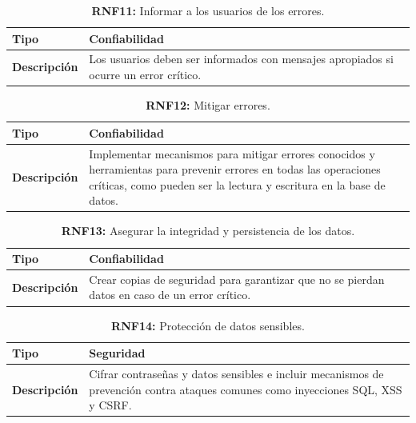 \documentclass[a4paper, 12pt]{article}
\begin{document}
\begin{table}[H]
\captionsetup{list=no}%
\captionsetup{justification=raggedright,singlelinecheck=false}
\captionsetup{labelformat=empty}
\caption{\textbf{RNF11:} Informar a los usuarios de los errores.}
\label{tab:RNF11}
    \begin{tabular}{|m{5cm}|m{10cm}|}
	    \hline
	    \textbf{Tipo} & Confiabilidad \\ 
	    \hline
	    \textbf{Descripción} & Los usuarios deben ser informados con mensajes apropiados si ocurre un error crítico. \\ 
	    \hline
    \end{tabular}
\end{table}

\begin{table}[H]
\captionsetup{list=no}%
\captionsetup{justification=raggedright,singlelinecheck=false}
\captionsetup{labelformat=empty}
\caption{\textbf{RNF12:} Mitigar errores.}
\label{tab:RNF12}
    \begin{tabular}{|m{5cm}|m{10cm}|}
	    \hline
	    \textbf{Tipo} & Confiabilidad \\ 
	    \hline
	    \textbf{Descripción} & Implementar mecanismos para mitigar errores conocidos y herramientas para prevenir errores en todas las operaciones críticas, como pueden ser la lectura y escritura en la base de datos. \\ 
	    \hline
    \end{tabular}
\end{table}

\begin{table}[H]
\captionsetup{list=no}%
\captionsetup{justification=raggedright,singlelinecheck=false}
\captionsetup{labelformat=empty}
\caption{\textbf{RNF13:} Asegurar la integridad y persistencia de los datos.}
\label{tab:RNF13}
    \begin{tabular}{|m{5cm}|m{10cm}|}
	    \hline
	    \textbf{Tipo} & Confiabilidad \\ 
	    \hline
	    \textbf{Descripción} & Crear copias de seguridad para garantizar que no se pierdan datos en caso de un error crítico. \\ 
	    \hline
    \end{tabular}
\end{table}


\begin{table}[H]
\captionsetup{list=no}%
\captionsetup{justification=raggedright,singlelinecheck=false}
\captionsetup{labelformat=empty}
\caption{\textbf{RNF14:} Protección de datos sensibles.}
\label{tab:RNF14}
    \begin{tabular}{|m{5cm}|m{10cm}|}
	    \hline
	    \textbf{Tipo} & Seguridad \\ 
	    \hline
	    \textbf{Descripción} & Cifrar contraseñas y datos sensibles e incluir mecanismos de prevención contra ataques comunes como inyecciones SQL, XSS y CSRF.\\ 
	    \hline
    \end{tabular}
\end{table}
\end{document}
